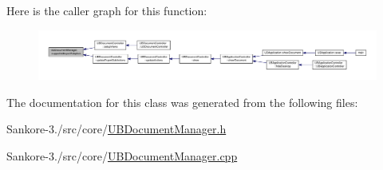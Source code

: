 Here is the caller graph for this function\-:
\nopagebreak
\begin{figure}[H]
\begin{center}
\leavevmode
\includegraphics[width=350pt]{d2/da1/class_u_b_document_manager_aa3dcc18dae4cb2b64c7af2c7c3122ee5_icgraph}
\end{center}
\end{figure}




The documentation for this class was generated from the following files\-:\begin{DoxyCompactItemize}
\item 
Sankore-\/3./src/core/\hyperlink{_u_b_document_manager_8h}{U\-B\-Document\-Manager.\-h}\item 
Sankore-\/3./src/core/\hyperlink{_u_b_document_manager_8cpp}{U\-B\-Document\-Manager.\-cpp}\end{DoxyCompactItemize}
